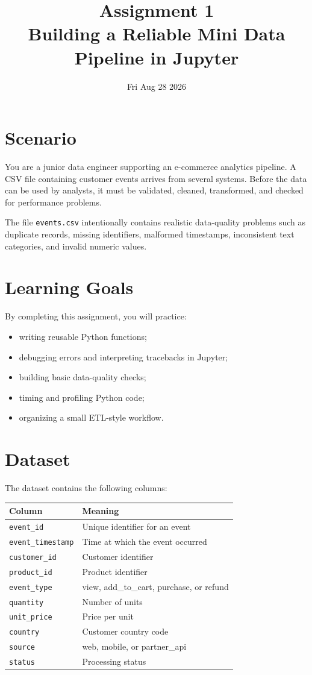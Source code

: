 \documentclass[10pt]{article}
\title{\textbf{Assignment 1}\\
       Building a Reliable Mini Data Pipeline in Jupyter}
\author{}
\date{Fri Aug 28 2026}
\begin{document}
\maketitle

\section*{Scenario}
You are a junior data engineer supporting an e-commerce analytics pipeline.
A CSV file containing customer events arrives from several systems. Before
the data can be used by analysts, it must be validated, cleaned, transformed,
and checked for performance problems.

The file \texttt{events.csv} intentionally contains realistic
data-quality problems such as duplicate records, missing identifiers,
malformed timestamps, inconsistent text categories, and invalid numeric values.

\section*{Learning Goals}
By completing this assignment, you will practice:
\begin{itemize}
    \item writing reusable Python functions;
    \item debugging errors and interpreting tracebacks in Jupyter;
    \item building basic data-quality checks;
    \item timing and profiling Python code;
    \item organizing a small ETL-style workflow.
\end{itemize}

\section*{Dataset}
The dataset contains the following columns:

\begin{center}
\begin{tabular}{ll}
\toprule
Column & Meaning \\
\midrule
\texttt{event\_id} & Unique identifier for an event \\
\texttt{event\_timestamp} & Time at which the event occurred \\
\texttt{customer\_id} & Customer identifier \\
\texttt{product\_id} & Product identifier \\
\texttt{event\_type} & view, add\_to\_cart, purchase, or refund \\
\texttt{quantity} & Number of units \\
\texttt{unit\_price} & Price per unit \\
\texttt{country} & Customer country code \\
\texttt{source} & web, mobile, or partner\_api \\
\texttt{status} & Processing status \\
\bottomrule
\end{tabular}
\end{center}
\end{document}
